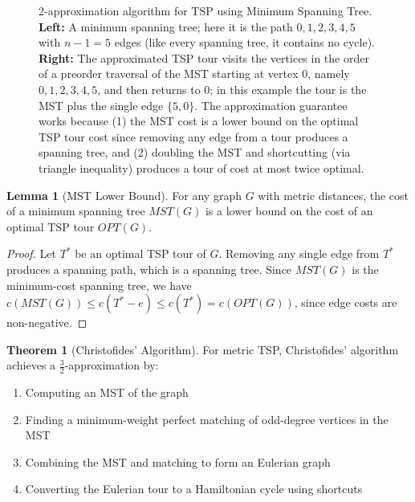 \documentclass{article}
\theoremstyle{definition}
\newtheorem{theorem}{Theorem}
\newtheorem{lemma}{Lemma}
\begin{document}
\begin{figure}[h]
\caption{2-approximation algorithm for TSP using Minimum Spanning Tree. \textbf{Left:} A minimum spanning tree; here it is the path $0, 1, 2, 3, 4, 5$ with $n - 1 = 5$ edges (like every spanning tree, it contains no cycle). \textbf{Right:} The approximated TSP tour visits the vertices in the order of a preorder traversal of the MST starting at vertex $0$, namely $0, 1, 2, 3, 4, 5$, and then returns to $0$; in this example the tour is the MST plus the single edge $\{5, 0\}$. The approximation guarantee works because (1) the MST cost is a lower bound on the optimal TSP tour cost since removing any edge from a tour produces a spanning tree, and (2) doubling the MST and shortcutting (via triangle inequality) produces a tour of cost at most twice optimal.}
\label{fig:tsp-approx}
\end{figure}

\begin{lemma}[MST Lower Bound]
For any graph $G$ with metric distances, the cost of a minimum spanning tree $MST(G)$ is a lower bound on the cost of an optimal TSP tour $OPT(G)$.
\end{lemma}

\begin{proof}
Let $T^*$ be an optimal TSP tour of $G$. Removing any single edge from $T^*$ produces a spanning path, which is a spanning tree. Since $MST(G)$ is the minimum-cost spanning tree, we have $c(MST(G)) \leq c(T^* - e) \leq c(T^*) = c(OPT(G))$, since edge costs are non-negative.
\end{proof}

\begin{theorem}[Christofides' Algorithm]
For metric TSP, Christofides' algorithm achieves a $\frac{3}{2}$-approximation by:
\begin{enumerate}
    \item Computing an MST of the graph
    \item Finding a minimum-weight perfect matching of odd-degree vertices in the MST
    \item Combining the MST and matching to form an Eulerian graph
    \item Converting the Eulerian tour to a Hamiltonian cycle using shortcuts
\end{enumerate}
\end{theorem}
\end{document}
